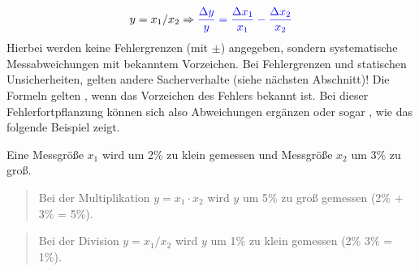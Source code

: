\documentclass[letterpaper,10pt,english]{jupyterBook}
\begin{document}
\begin{equation*}
\begin{split}y=x_1 / x_2 \Rightarrow  \color{blue}{
   \frac{\Delta y}{y} =  \frac{\Delta x_1}{x_1} - \frac{\Delta x_2}{x_2} }\end{split}
\end{equation*}
\sphinxAtStartPar
{} Hierbei werden keine Fehlergrenzen (mit \(\pm\)) angegeben, sondern systematische Messabweichungen mit bekanntem Vorzeichen. Bei Fehlergrenzen und statischen Unsicherheiten, gelten andere Sacherverhalte (siehe nächsten Abschnitt)! Die Formeln gelten , wenn das Vorzeichen des Fehlers bekannt ist. Bei dieser Fehlerfortpflanzung können sich also Abweichungen ergänzen oder sogar , wie das folgende Beispiel zeigt.

\sphinxAtStartPar
{} Eine Messgröße \(x_1\) wird um 2\% zu klein gemessen und Messgröße \(x_2\) um 3\% zu groß.
\begin{quote}

\sphinxAtStartPar
Bei der Multiplikation \(y=x_1 \cdot x_2\) wird \(y\) um 5\% zu groß gemessen (2\% + 3\% = 5\%).
\end{quote}
\begin{quote}

\sphinxAtStartPar
Bei der Division \(y=x_1 / x_2\) wird \(y\) um 1\% zu klein gemessen (2\% \sphinxhyphen{} 3\% = \sphinxhyphen{}1\%).
\end{quote}
\end{document}
